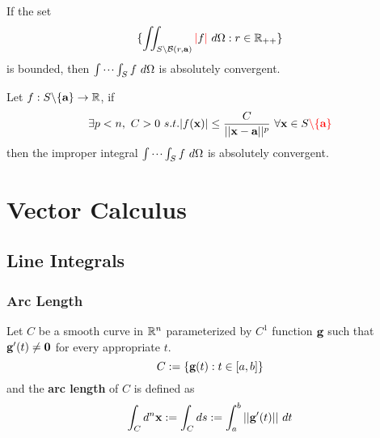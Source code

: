 \documentclass[11pt]{article}
\begin{document}
				\begin{corollary}[Equivalence]
					If the set
					\begin{equation}
						\{\iint_{S \backslash \mathcal{{B}}(r, \textbf{a})} \textcolor{red}{|}f\textcolor{red}{|}\ d\Omega: r \in \mathbb{R}_{++}\}
					\end{equation}
					is bounded, then $\idotsint_S f\ d\Omega$ is absolutely convergent.
				\end{corollary}
				
				\begin{corollary}
					Let $f: S\backslash \{\textbf{a}\} \to \mathbb{R}$, if 
					\begin{equation}
						\exists p < n,\ C > 0\ s.t. |f(\ve{x})| \leq \frac{C}{\norm{\ve{x} - \ve{a}}^p}\ \forall \ve{x} \in S \red{\backslash \{\ve{a}\}}
					\end{equation}
					then the improper integral $\idotsint_S f\ d\Omega$ is absolutely convergent.
				\end{corollary}
				
	\section{Vector Calculus}
		\subsection{Line Integrals}
		\subsubsection{Arc Length}
			\begin{definition}
				Let $C$ be a smooth curve in $\mathbb{R}^n$ parameterized by $C^1$ function $\textbf{g}$ such that $\textbf{g}'(t) \neq \textbf{0}$ for every appropriate $t$.
				\begin{equation}
					C := \{\textbf{g}(t): t \in [a, b]\}
				\end{equation}
				and the \textbf{arc length} of $C$ is defined as
				\begin{gather}
					\int_C d^n\textbf{x} := \int_C ds := \int_a^b \vert \vert {\textbf{g}'(t)} \vert \vert\ dt
				\end{gather}
			\end{definition}
			
\end{document}

